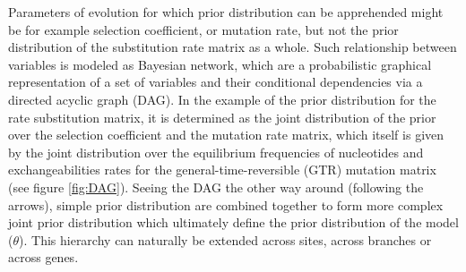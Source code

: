 Parameters of evolution for which \gls{prior} distribution can be apprehended might be for example selection coefficient, or mutation rate, but not the \gls{prior} distribution of the \gls{substitution} rate matrix as a whole.
Such relationship between variables is modeled as Bayesian network, which are a probabilistic graphical representation of a set of variables and their conditional dependencies via a directed acyclic graph (DAG).
In the example of the \gls{prior} distribution for the rate \gls{substitution} matrix, it is determined as the joint distribution of the \gls{prior} over the selection coefficient and the mutation rate matrix, which itself is given by the joint distribution over the equilibrium frequencies of nucleotides and exchangeabilities rates for the general-time-reversible (GTR) mutation matrix (see figure \ref{fig:DAG}).
Seeing the DAG the other way around (following the arrows), simple \gls{prior} distribution are combined together to form more complex joint \gls{prior} distribution which ultimately define the \gls{prior} distribution of the model ($\theta$).
This hierarchy can naturally be extended across sites, across branches or across genes.

